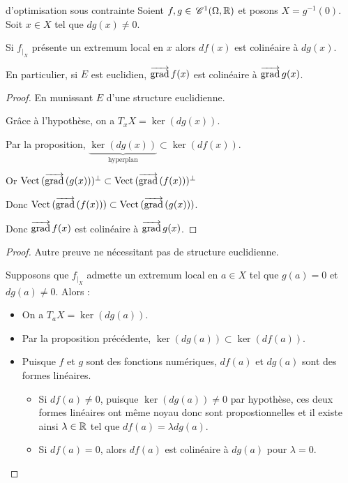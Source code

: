 \begin{theoreme}{d'optimisation sous contrainte}{}
    Soient $f, g \in \,\mathscr C^{1} (\Omega, \mathbb{R})$ et posons $X = g^{-1}(0)$.
    Soit $x \in X$ tel que $dg(x) \neq 0$. 

    Si $f_{|_X}$ présente un extremum local en $x$ alors $df(x)$ est colinéaire à $dg(x)$. 

    En particulier, si $E$ est euclidien, $\overrightarrow{\operatorname{grad}} \, f (x)$ est colinéaire à $\overrightarrow{\operatorname{grad}} \, g(x)$.
\end{theoreme}

\begin{proof}
    En munissant $E$ d'une structure euclidienne. 

    Grâce à l'hypothèse, on a $T_x X = \ker (dg(x))$. 

    Par la proposition, $\underbrace{\ker (dg(x))}_{\text{hyperplan}} \subset \ker (df(x))$.

    Or $\operatorname{Vect} \,(\overrightarrow{\operatorname{grad}} \,(g(x)))^\perp \subset \operatorname{Vect} \,(\overrightarrow{\operatorname{grad}} \, (f(x)))^\perp$

    Donc $\operatorname{Vect} \,(\overrightarrow{\operatorname{grad}} \, (f(x))) \subset \operatorname{Vect} \,(\overrightarrow{\operatorname{grad}} \, (g(x)))$.

    Donc $\overrightarrow{\operatorname{grad}} \, f(x)$ est colinéaire à $\overrightarrow{\operatorname{grad}} \, g(x)$.
\end{proof}

\begin{proof}
    Autre preuve ne nécessitant pas de structure euclidienne.

    Supposons que $f_{|_X}$ admette un extremum local en $a \in X$ tel que $g(a) = 0$ et $dg(a) \neq 0$. Alors : 
    \begin{itemize}
        \item On a $T_a X = \ker(dg(a))$.
        \item Par la proposition précédente, $\ker(dg(a)) \subset \ker(df(a))$.
        \item Puisque $f$ et $g$ sont des fonctions numériques, $df(a)$ et $dg(a)$ sont des formes linéaires.
        \begin{itemize}
            \item Si $df(a) \neq 0$, puisque $\ker(dg(a)) \neq 0$ par hypothèse, ces deux formes linéaires ont même 
            noyau donc sont propostionnelles et il existe ainsi $\lambda \in \mathbb{R}$ tel que $df(a) = \lambda dg(a)$.
            \item Si $df(a) = 0$, alors $df(a)$ est colinéaire à $dg(a)$ pour $\lambda = 0$. 
        \end{itemize}
    \end{itemize}
\end{proof}

